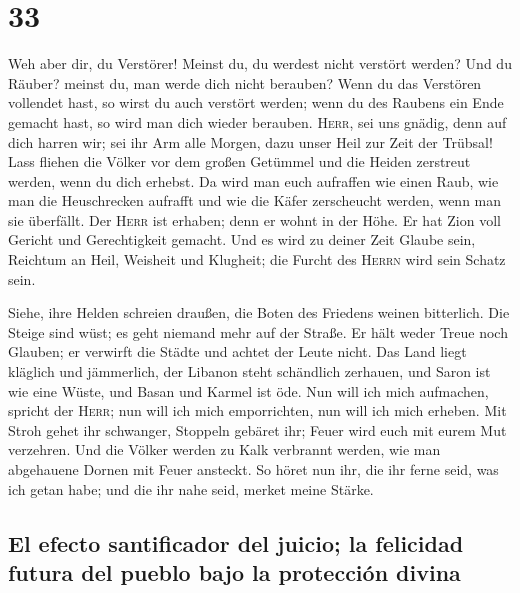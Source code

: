\hypertarget{section-32}{%
\section{33}\label{section-32}}

 Weh aber dir, du Verstörer! Meinst du, du werdest nicht
verstört werden? Und du Räuber? meinst du, man werde dich nicht
berauben? Wenn du das Verstören vollendet hast, so wirst du auch
verstört werden; wenn du des Raubens ein Ende gemacht hast, so wird man
dich wieder berauben.  \textsc{Herr}, sei uns gnädig, denn
auf dich harren wir; sei ihr Arm alle Morgen, dazu unser Heil zur Zeit
der Trübsal!  Lass fliehen die Völker vor dem großen
Getümmel und die Heiden zerstreut werden, wenn du dich erhebst.
 Da wird man euch aufraffen wie einen Raub, wie man die
Heuschrecken aufrafft und wie die Käfer zerscheucht werden, wenn man sie
überfällt.  Der \textsc{Herr} ist erhaben; denn er wohnt
in der Höhe. Er hat Zion voll Gericht und Gerechtigkeit gemacht.
 Und es wird zu deiner Zeit Glaube sein, Reichtum an Heil,
Weisheit und Klugheit; die Furcht des \textsc{Herrn} wird sein Schatz
sein.

 Siehe, ihre Helden schreien draußen, die Boten des
Friedens weinen bitterlich.  Die Steige sind wüst; es geht
niemand mehr auf der Straße. Er hält weder Treue noch Glauben; er
verwirft die Städte und achtet der Leute nicht.  Das Land
liegt kläglich und jämmerlich, der Libanon steht schändlich zerhauen,
und Saron ist wie eine Wüste, und Basan und Karmel ist öde.
 Nun will ich mich aufmachen, spricht der \textsc{Herr};
nun will ich mich emporrichten, nun will ich mich erheben.
 Mit Stroh gehet ihr schwanger, Stoppeln gebäret ihr;
Feuer wird euch mit eurem Mut verzehren.  Und die Völker
werden zu Kalk verbrannt werden, wie man abgehauene Dornen mit Feuer
ansteckt.  So höret nun ihr, die ihr ferne seid, was ich
getan habe; und die ihr nahe seid, merket meine Stärke.

\hypertarget{el-efecto-santificador-del-juicio-la-felicidad-futura-del-pueblo-bajo-la-protecciuxf3n-divina}{%
\subsection{El efecto santificador del juicio; la felicidad futura del
pueblo bajo la protección
divina}\label{el-efecto-santificador-del-juicio-la-felicidad-futura-del-pueblo-bajo-la-protecciuxf3n-divina}}

